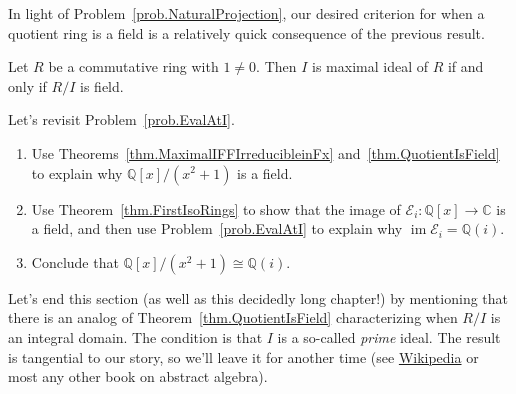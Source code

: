 In light of Problem~\ref{prob.NaturalProjection}, our desired criterion for when a quotient ring is  a field is a relatively quick consequence of the previous result. 

\begin{theorem}\label{thm.QuotientIsField}
Let $R$ be a commutative ring with $1\neq0$. Then $I$ is maximal ideal of $R$ if and only if $R/I$ is field.
\end{theorem}

\begin{problem}\label{prob.EvalAtI-Take2}
Let's revisit Problem~\ref{prob.EvalAtI}.
\begin{enumerate}
\item Use Theorems~\ref{thm.MaximalIFFIrreducibleinFx} and~\ref{thm.QuotientIsField} to explain why $\mathbb{Q}[x]/(x^2+1)$ is a field. 
\item Use Theorem~\ref{thm.FirstIsoRings} to show that the image of $\mathcal{E}_{i}:\mathbb{Q}[x]\rightarrow\mathbb{C}$ is a field, and then use Problem~\ref{prob.EvalAtI} to explain why $\operatorname{im} \mathcal{E}_{i}=\mathbb{Q}(i)$.
\item Conclude that $\mathbb{Q}[x]/(x^2+1) \cong \mathbb{Q}(i)$.
\end{enumerate}
\end{problem}

Let's end this section (as well as this decidedly long chapter!) by mentioning that there is an analog of Theorem~\ref{thm.QuotientIsField} characterizing when $R/I$ is an integral domain. The condition is that $I$ is a so-called \textit{prime} ideal. The result is tangential to our story, so we'll leave it for another time (see \href{https://en.wikipedia.org/wiki/Prime_ideal#Connection_to_maximality}{Wikipedia} or most any other book on abstract algebra).




